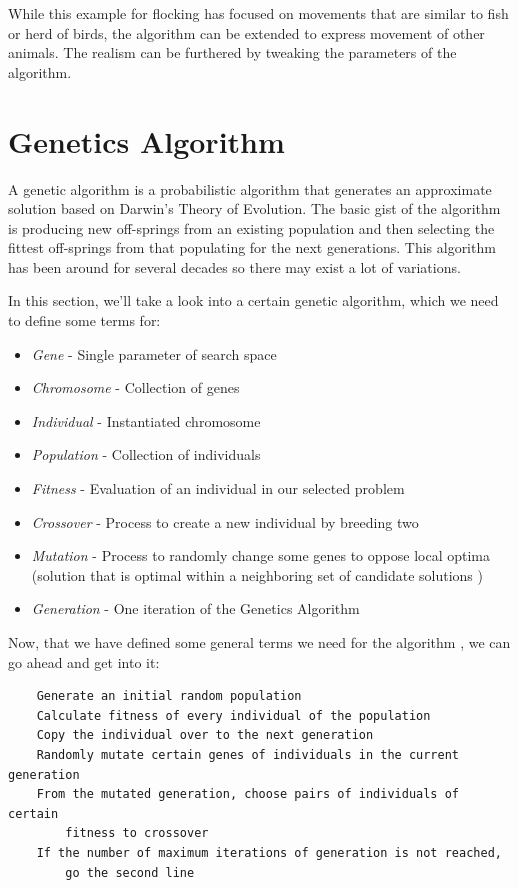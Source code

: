 \documentclass[a4paper, 12pt]{book}
\begin{document}
While this example for flocking \cite{FlocksReynolds} has focused on movements that are similar to fish or herd of birds, the algorithm can be extended to express movement of other animals. The realism can be furthered by tweaking the parameters of the algorithm.

\section{Genetics Algorithm}

A genetic algorithm \cite{GameAIGeneticAlg} is a probabilistic algorithm that generates an approximate solution based on Darwin’s Theory of Evolution. The basic gist of the algorithm is producing new off-springs from an existing population and then selecting the fittest off-springs from that populating for the next generations. This algorithm has been around for several decades so there may exist a lot of variations.

In this section, we'll take a look into a certain genetic algorithm, which we need to define some terms for:

\begin{itemize}
    \item \emph{Gene} - Single parameter of search space
    \item \emph{Chromosome} - Collection of genes
    \item \emph{Individual} - Instantiated chromosome
    \item \emph{Population} - Collection of individuals
    \item \emph{Fitness} - Evaluation of an individual in our selected problem
    \item \emph{Crossover} - Process to create a new individual by breeding two
    \item \emph{Mutation} - Process to randomly change some genes to oppose local optima (solution that is optimal within a neighboring set of candidate solutions \cite{LocalOptimum}) 
    \item \emph{Generation} - One iteration of the Genetics Algorithm
\end{itemize}

Now, that we have defined some general terms we need for the algorithm \cite{GameAIGeneticAlg}, we can go ahead and get into it:

\begin{verbatim}
    Generate an initial random population
    Calculate fitness of every individual of the population
    Copy the individual over to the next generation
    Randomly mutate certain genes of individuals in the current generation
    From the mutated generation, choose pairs of individuals of certain 
        fitness to crossover
    If the number of maximum iterations of generation is not reached, 
        go the second line
\end{verbatim}
\end{document}
